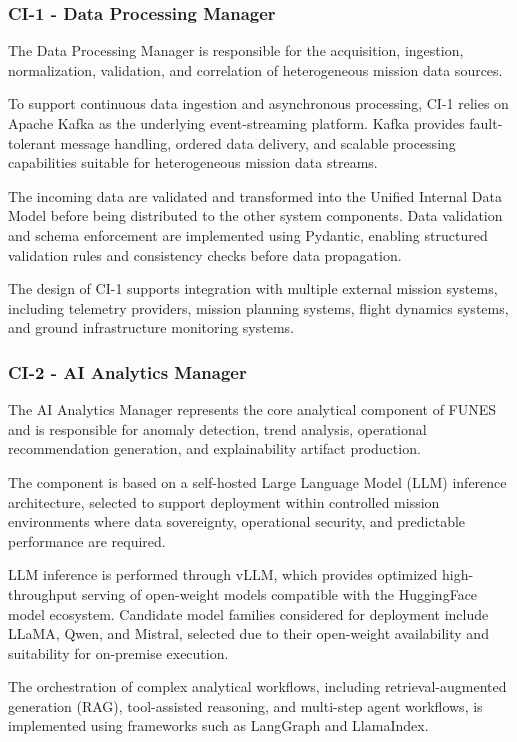 \subsubsection{CI-1 - Data Processing Manager}

The Data Processing Manager is responsible for the acquisition, ingestion, normalization, validation, and correlation of heterogeneous mission data sources.

To support continuous data ingestion and asynchronous processing, CI-1 relies on Apache Kafka as the underlying event-streaming platform. Kafka provides fault-tolerant message handling, ordered data delivery, and scalable processing capabilities suitable for heterogeneous mission data streams.

The incoming data are validated and transformed into the Unified Internal Data Model before being distributed to the other system components. Data validation and schema enforcement are implemented using Pydantic, enabling structured validation rules and consistency checks before data propagation.

The design of CI-1 supports integration with multiple external mission systems, including telemetry providers, mission planning systems, flight dynamics systems, and ground infrastructure monitoring systems.

\subsubsection{CI-2 - AI Analytics Manager}

The AI Analytics Manager represents the core analytical component of FUNES and is responsible for anomaly detection, trend analysis, operational recommendation generation, and explainability artifact production.

The component is based on a self-hosted Large Language Model (LLM) inference architecture, selected to support deployment within controlled mission environments where data sovereignty, operational security, and predictable performance are required.

LLM inference is performed through vLLM, which provides optimized high-throughput serving of open-weight models compatible with the HuggingFace model ecosystem. Candidate model families considered for deployment include LLaMA, Qwen, and Mistral, selected due to their open-weight availability and suitability for on-premise execution.

The orchestration of complex analytical workflows, including retrieval-augmented generation (RAG), tool-assisted reasoning, and multi-step agent workflows, is implemented using frameworks such as LangGraph and LlamaIndex.

